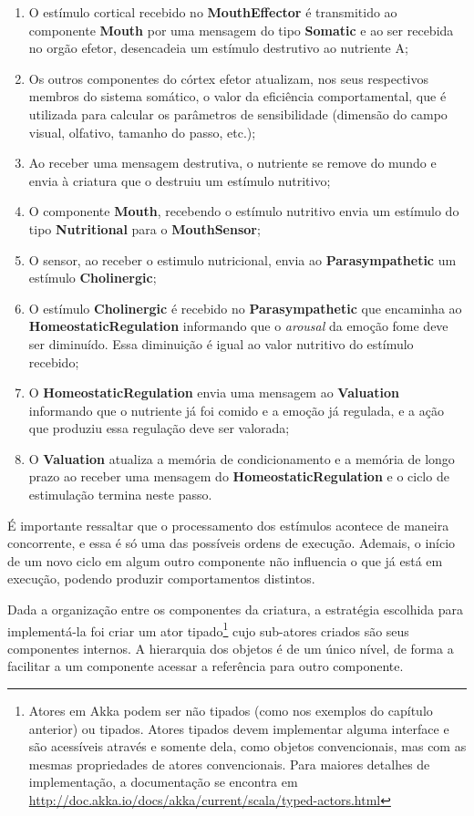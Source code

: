\begin{enumerate}
    \item O estímulo cortical recebido no \textbf{MouthEffector} é transmitido ao componente \textbf{Mouth} por uma mensagem do tipo \textbf{Somatic} e ao ser recebida no orgão efetor, desencadeia um estímulo destrutivo ao nutriente A;
    \item Os outros componentes do córtex efetor atualizam, nos seus respectivos membros do sistema somático, o valor da eficiência comportamental, que é utilizada para calcular os parâmetros de sensibilidade (dimensão do campo visual, olfativo, tamanho do passo, etc.);
    \item Ao receber uma mensagem destrutiva, o nutriente se remove do mundo e envia à criatura que o destruiu um estímulo nutritivo;
    \item O componente \textbf{Mouth}, recebendo o estímulo nutritivo envia um estímulo do tipo \textbf{Nutritional} para o \textbf{MouthSensor};
    \item O sensor, ao receber o estimulo nutricional, envia ao \textbf{Parasympathetic} um estímulo \textbf{Cholinergic};
    \item O estímulo \textbf{Cholinergic} é recebido no \textbf{Parasympathetic} que encaminha ao \textbf{HomeostaticRegulation} informando que o \textit{arousal} da emoção fome deve ser diminuído. Essa diminuição é igual ao valor nutritivo do estímulo recebido;
    \item O \textbf{HomeostaticRegulation} envia uma mensagem ao \textbf{Valuation} informando que o nutriente já foi comido e a emoção já regulada, e a ação que produziu essa regulação deve ser valorada;
    \item O \textbf{Valuation} atualiza a memória de condicionamento e a memória de longo prazo ao receber uma mensagem do \textbf{HomeostaticRegulation} e o ciclo de estimulação termina neste passo.
\end{enumerate}

É importante ressaltar que o processamento dos estímulos acontece de  maneira concorrente,  e essa é só uma das possíveis ordens de execução. Ademais, o início de um novo ciclo em algum outro componente não influencia o que já está em execução, podendo produzir comportamentos distintos.

Dada a organização entre os componentes da criatura, a estratégia escolhida  para implementá-la  foi criar um ator tipado\footnote{Atores em Akka podem ser não tipados (como nos exemplos do capítulo anterior) ou tipados. Atores tipados devem implementar alguma interface e são acessíveis através e somente dela, como objetos convencionais, mas com as mesmas propriedades de atores convencionais. Para maiores detalhes de implementação, a documentação se encontra em \url{http://doc.akka.io/docs/akka/current/scala/typed-actors.html}} cujo sub-atores criados são seus componentes internos. A hierarquia dos objetos é de um único nível, de forma a facilitar a um componente acessar a referência para outro componente. 

